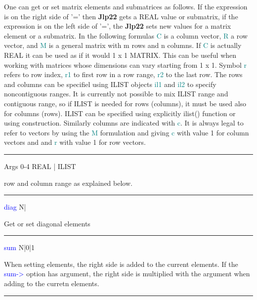 One can get or set matrix elements and submatrices as follows. If the expression
is on the right side of '=' then \textbf{Jlp22} gets a REAL value or submatrix, if the expression
is on the left side of '=', the \textbf{Jlp22} sets new values for a matrix element or a submatrix.
In the following formulas \textcolor{teal}{C} is a column vector, \textcolor{teal}{R} a row vector, and \textcolor{teal}{M} is
a general matrix with m rows and n columns.
If \textcolor{teal}{C} is actually REAL it can
be used as if it would 1 x 1 MATRIX. This can be useful when working with
matrices whose dimensions can vary starting from 1 x 1. Symbol \textcolor{teal}{r} refers to
row index, \textcolor{teal}{r1} to first row in a row range, \textcolor{teal}{r2} to the last row. The rows and
columns can be specifiel using ILIST objects \textcolor{teal}{il1} and \textcolor{teal}{il2} to specify noncontiguous ranges.
It is currently not possible to mix ILIST range and contiguous range, so if ILIST
is needed for rows (columns), it must be used also for columns (rows). ILIST can be
specified using explicitly \textcolor{VioletRed}{ilist}() function or using {} construction.
Similarly columns are indicated  with \textcolor{teal}{c}. It is always legal to refer to
vectors by using the \textcolor{teal}{M} formulation and giving \textcolor{teal}{c} with value 1 for column vectors and
and \textcolor{teal}{r} with value 1 for row vectors.
\vspace{0.3cm}
\hrule
\vspace{0.3cm}
\noindent Args \tabto{3cm} 0-4 \tabto{5cm}  REAL | ILIST \tabto{7cm}
\begin{changemargin}{3cm}{0cm}
\noindent row and column range as explained below.
\end{changemargin}
\vspace{0.3cm}
\hrule
\vspace{0.3cm}
\noindent \textcolor{blue}{diag} \tabto{3cm} N| \tabto{5cm}    \tabto{7cm}
\begin{changemargin}{3cm}{0cm}
\noindent Get or set diagonal elements
\end{changemargin}
\vspace{0.3cm}
\hrule
\vspace{0.3cm}
\noindent \textcolor{blue}{sum} \tabto{3cm} N|0|1 \tabto{5cm}    \tabto{7cm}
\begin{changemargin}{3cm}{0cm}
\noindent  When setting elements, the right side is added to the current elements. If the
\textcolor{blue}{sum->} option has argument, the right side is multiplied with the argument when adding to the curretn elements.
\end {changemargin}
\hrule
\vspace{0.2cm}

